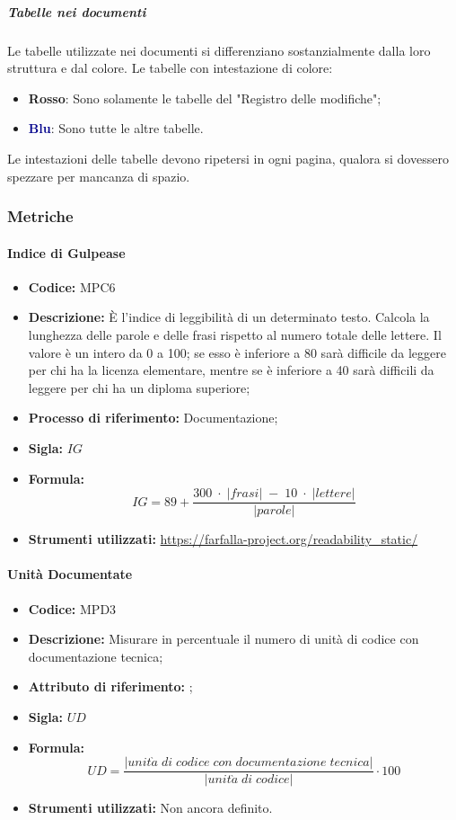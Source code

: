 \subparagraph*{Tabelle nei documenti}
Le tabelle utilizzate nei documenti si differenziano sostanzialmente dalla loro struttura e dal colore.
Le tabelle con intestazione di colore:
\begin{itemize}
    \item \textcolor{rossoep}{\textbf{Rosso}}: Sono solamente le tabelle del "Registro delle modifiche";
    \item \textcolor{darkblue}{\textbf{Blu}}: Sono tutte le altre tabelle.
\end{itemize}
Le intestazioni delle tabelle devono ripetersi in ogni pagina, qualora si dovessero spezzare per mancanza di spazio.

\subsubsection{Metriche}

\paragraph{Indice di Gulpease}
\begin{itemize}
	\item \textbf{Codice:} MPC6
	\item \textbf{Descrizione:} È l'indice di leggibilità di un determinato testo. Calcola la lunghezza delle parole e delle frasi rispetto al numero totale delle lettere. Il valore è un intero da 0 a 100; se esso è inferiore a 80 sarà difficile da leggere per chi ha la licenza elementare, mentre se è inferiore a 40 sarà difficili da leggere per chi ha un diploma superiore;
	\item \textbf{Processo di riferimento:} Documentazione;
	\item \textbf{Sigla:} $IG$
	\item \textbf{Formula:} $$IG = 89 + {\frac{300 \; \cdot \; |frasi| \; - \; 10 \; \cdot \; |lettere|}{|parole|}}$$
	\item \textbf{Strumenti utilizzati:} \url{https://farfalla-project.org/readability_static/}
\end{itemize}

\paragraph{Unità Documentate} 
\begin{itemize}
    \item \textbf{Codice:} MPD3
    \item \textbf{Descrizione:} Misurare in percentuale il numero di unità di codice con documentazione tecnica;
    \item \textbf{Attributo di riferimento:} ;
    \item \textbf{Sigla:} $UD$
    \item \textbf{Formula:} $$UD = \frac{|unit\grave{a} \; di \; codice \; con \; documentazione \; tecnica|}{|unit\grave{a} \; di \; codice|} \cdot 100$$
    \item \textbf{Strumenti utilizzati:} Non ancora definito.
\end{itemize}

